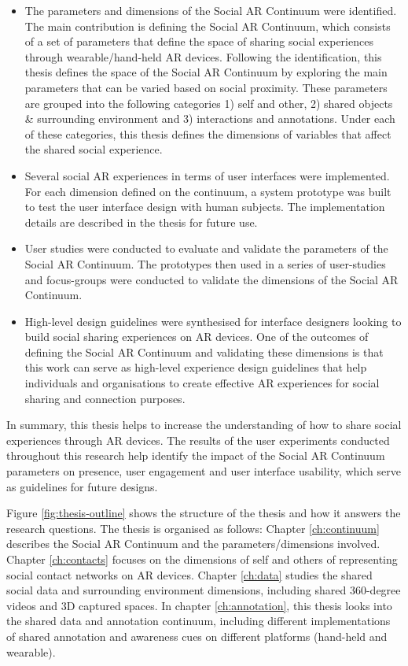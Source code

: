 \begin{itemize}
    \item The parameters and dimensions of the Social AR Continuum were identified. The main contribution is defining the Social AR Continuum, which consists of a set of parameters that define the space of sharing social experiences through wearable/hand-held AR devices. Following the identification, this thesis defines the space of the Social AR Continuum by exploring the main parameters that can be varied based on social proximity. These parameters are grouped into the following categories 1) self and other, 2) shared objects \& surrounding environment and 3) interactions and annotations. Under each of these categories, this thesis defines the dimensions of variables that affect the shared social experience.
    
    \item Several social AR experiences in terms of user interfaces were implemented. For each dimension defined on the continuum, a system prototype was built to test the user interface design with human subjects. The implementation details are described in the thesis for future use.
    
    \item User studies were conducted to evaluate and validate the parameters of the Social AR Continuum. The prototypes then used in a series of user-studies and focus-groups were conducted to validate the dimensions of the Social AR Continuum.
    
    \item High-level design guidelines were synthesised for interface designers looking to build social sharing experiences on AR devices. One of the outcomes of defining the Social AR Continuum and validating these dimensions is that this work can serve as high-level experience design guidelines that help individuals and organisations to create effective AR experiences for social sharing and connection purposes.
\end{itemize}

In summary, this thesis helps to increase the understanding of how to share social experiences through AR devices. The results of the user experiments conducted throughout this research help identify the impact of the Social AR Continuum parameters on presence, user engagement and user interface usability, which serve as guidelines for future designs. 

Figure \ref{fig:thesis-outline} shows the structure of the thesis and how it answers the research questions. The thesis is organised as follows: Chapter \ref{ch:continuum} describes the Social AR Continuum and the parameters/dimensions involved. 
Chapter \ref{ch:contacts} focuses on the dimensions of self and others of representing social contact networks on AR devices. 
Chapter \ref{ch:data} studies the shared social data and surrounding environment dimensions, including shared 360-degree videos and 3D captured spaces. 
In chapter \ref{ch:annotation}, this thesis looks into the shared data and annotation continuum, including different implementations of shared annotation and awareness cues on different platforms (hand-held and wearable).


